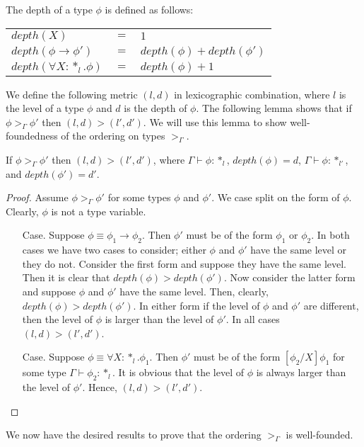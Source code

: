 \begin{definition}
  The depth of a type $\phi$ is defined as follows:
  \begin{center}
    \begin{tabular}{lll}
      $depth(X)$                  & $=$ & $1$\\
      $depth(\phi \to \phi')$     & $=$ & $depth(\phi) + depth(\phi')$\\
      $depth(\forall X:*_l.\phi)$ & $=$ & $depth(\phi) + 1$\\
    \end{tabular}
  \end{center}
\end{definition}

We define the following metric $(l,d)$ in lexicographic combination,
where $l$ is the level of a type $\phi$ and $d$ is the depth of
$\phi$.  The following lemma shows that if $\phi >_\Gamma \phi'$ then
$(l,d) > (l',d')$.  We will use this lemma to show well-foundedness of
the ordering on types $>_\Gamma$.  

\begin{lemma}
  \label{lemma:well-founded_measure_ssf}
  If $\phi >_\Gamma \phi'$ then $(l,d) > (l',d')$, where $\Gamma \vdash \phi:*_l$, 
  $depth(\phi) = d$,  $\Gamma \vdash \phi:*_{l'}$, and $depth(\phi') = d'$.
\end{lemma}
\begin{proof}
  Assume $\phi >_\Gamma \phi'$ for some types $\phi$ and $\phi'$.  We case split on
  the form of $\phi$.  Clearly, $\phi$ is not a type variable.
  \begin{itemize}
  \item[Case.]  Suppose $\phi \equiv \phi_1 \to \phi_2$.  Then $\phi'$ must be of the 
    form $\phi_1$ or $\phi_2$.  In both
    cases we have two cases to
    consider; either $\phi$ and $\phi'$ have the same level or they do not.  Consider the
    first form and suppose they have the same level.  Then it is clear that 
    $depth(\phi) > depth(\phi')$.  Now consider the latter form and suppose
    $\phi$ and $\phi'$ have the same level.  Then, clearly, $depth(\phi) > depth(\phi')$.  
    In either form if the level of $\phi$ and $\phi'$ are different, then the level of 
    $\phi$ is larger than the level of $\phi'$.  In all cases $(l,d) > (l',d')$.
    
  \item[Case.] Suppose $\phi \equiv \forall X:*_l.\phi_1$.  Then $\phi'$ must be of the
    form $[\phi_2/X]\phi_1$ for some type $\Gamma \vdash \phi_2:*_l$.  It is obvious that
    the level of $\phi$ is always larger than the level of $\phi'$.  Hence, $(l,d) > (l',d')$.
  \end{itemize}
\end{proof}
\noindent We now have the desired results to prove that the ordering $>_\Gamma$ is 
well-founded.

